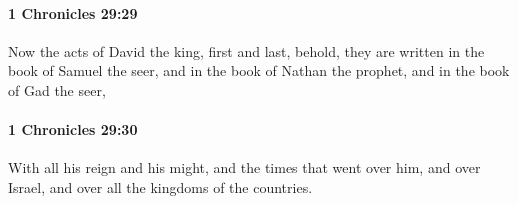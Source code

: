 		\paragraph{1 Chronicles 29:29} %
			\label{1CHRONICLES-29-29}

			Now the acts of David the king, first and last, behold, they are written in the book of Samuel the seer, and in the book of Nathan the prophet, and in the book of Gad the seer,


		\paragraph{1 Chronicles 29:30} %
			\label{1CHRONICLES-29-30}

			With all his reign and his might, and the times that went over him, and over Israel, and over all the kingdoms of the countries.

